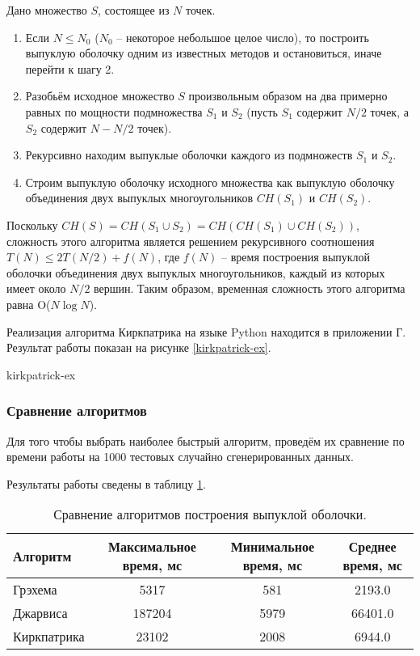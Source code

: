 Дано множество $S$, состоящее из $N$ точек. 
\begin{enumerate}
	\item Если $N \leq N_0$ ($N_0$ -- некоторое небольшое целое число),
то построить выпуклую оболочку одним из известных методов и
остановиться, иначе перейти к шагу 2.
	\item Разобьём исходное множество $S$ произвольным образом на два 
примерно равных по мощности подмножества $S_1$ и $S_2$ (пусть $S_1$
содержит $N/2$ точек, а $S_2$ содержит $N-N/2$ точек).
	\item Рекурсивно находим выпуклые оболочки каждого из подмножеств
$S_1$ и $S_2$.
	\item Строим выпуклую оболочку исходного множества как выпуклую 
оболочку объединения двух выпуклых многоугольников $CH(S_1)$ и
$CH(S_2)$.
\end{enumerate}
Поскольку $CH(S)=CH(S_1 \cup S_2) = CH(CH(S_1)\cup CH(S_2))$,
сложность этого алгоритма является решением рекурсивного соотношения
$T(N)\leq 2T(N/2)+f(N)$, где $f(N)$ -- время построения выпуклой
оболочки объединения двух выпуклых многоугольников, каждый из которых
имеет около $N/2$ вершин. Таким образом, временная сложность
этого алгоритма равна O($N\log{N}$).

Реализация алгоритма Киркпатрика на языке Python находится в
приложении Г. Результат работы показан на рисунке \ref{kirkpatrick-ex}.

{kirkpatrick-ex}

\subsubsection{Сравнение алгоритмов}

Для того чтобы выбрать наиболее быстрый алгоритм, проведём их сравнение
по времени работы на 1000 тестовых случайно сгенерированных данных.

Результаты работы сведены в таблицу \ref{table-compare-hull}.

\begin{table}[h]
\begin{center}
\begin{tabular}{|l|c|c|c|}
\hline Алгоритм & Максимальное время, мс &
Минимальное время, мс & Среднее время, мс\\
\hline  Грэхема &  5317 & 581 & 2193.0 \\
\hline  Джарвиса & 187204 & 5979 & 66401.0 \\
\hline  Киркпатрика & 23102 & 2008  & 6944.0 \\
\hline
\end{tabular}
\end{center}
\caption{\label{table-compare-hull} Сравнение алгоритмов построения
выпуклой оболочки.}
\end{table}

